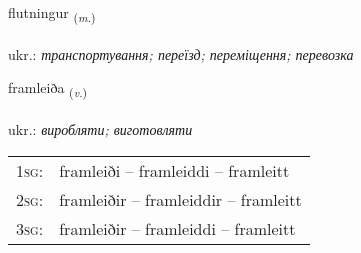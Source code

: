 \documentclass[frontgrid, backgrid]{flacards}\usepackage[]{graphicx}\usepackage[]{xcolor}
\begin{document}
\renewcommand{\flhead}{\vskip5pt \fboxsep=0pt {\small\bfseries\footnotesize Nafnorð | іменник}}
\renewcommand{\fcfoot}{\vskip5pt \fboxsep=0pt \hspace{2pt}{\small\bfseries\footnotesize 2K}}

\renewcommand{\blhead}{\vskip5pt {\small\bfseries\footnotesize Nafnorð | іменник }}
\renewcommand{\bcfoot}{\vskip5pt \hspace{2pt}{\small\bfseries\footnotesize 2K}}


{flutningur \small{\textsubscript{(\textit{m.})}} \\[1ex] %
\textphonetic{[flʏhtniŋkʏr]} \\
ukr.: \emph{транспортування; переїзд; переміщення; перевозка} \\  [2ex]
\renewcommand*{\arraystretch}{0.8}
}

\renewcommand{\flhead}{\vskip5pt \fboxsep=0pt {\small\bfseries\footnotesize Sagnorð | дієслово}}
\renewcommand{\fcfoot}{\vskip5pt \fboxsep=0pt \hspace{2pt}{\small\bfseries\footnotesize 2K}}

\renewcommand{\blhead}{\vskip5pt {\small\bfseries\footnotesize Sagnorð | дієслово }}
\renewcommand{\bcfoot}{\vskip5pt \hspace{2pt}{\small\bfseries\footnotesize 2K}}


{framleiða \small{\textsubscript{(\textit{v.})}} \\[1ex] %
\textphonetic{[framleiða]} \\
ukr.: \emph{виробляти; виготовляти} \\  [2ex]
\renewcommand*{\arraystretch}{0.8}
\begin{tabular}{p{1cm}l}
\textsc{1sg}: & framleiði -- framleiddi -- framleitt \\ 
\textsc{2sg}: & framleiðir -- framleiddir -- framleitt \\ 
\textsc{3sg}: & framleiðir -- framleiddi -- framleitt \\ 
\end{tabular}
}
\end{document}
